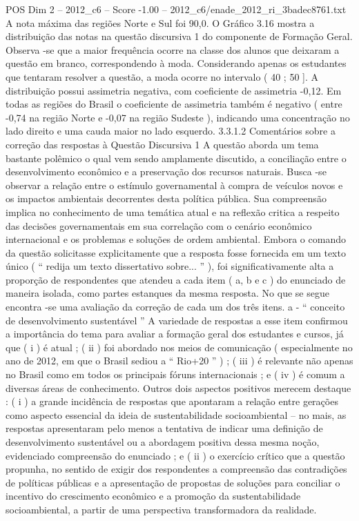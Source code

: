 \begin{textsample}{POS Dim 2 – 2012\_c6 – Score -1.00 – 2012\_c6/enade\_2012\_ri\_3badec8761.txt}
A nota máxima das regiões Norte e Sul foi 90,0.
O Gráfico 3.16 mostra a distribuição das notas na questão discursiva 1 do componente de Formação Geral.
Observa -se que a maior frequência ocorre na classe dos alunos que deixaram a questão em branco, correspondendo à moda.
Considerando apenas os estudantes que tentaram resolver a questão, a moda ocorre no intervalo ( 40 ; 50 ].
A distribuição possui assimetria negativa, com coeficiente de assimetria -0,12.
Em todas as regiões do Brasil o coeficiente de assimetria também é negativo ( entre -0,74 na região Norte e -0,07 na região Sudeste ), indicando uma concentração no lado direito e uma cauda maior no lado esquerdo. 3.3.1.2 Comentários sobre a correção das respostas à Questão Discursiva 1 A questão aborda um tema bastante polêmico o qual vem sendo amplamente discutido, a conciliação entre o desenvolvimento econômico e a preservação dos recursos naturais.
Busca -se observar a relação entre o estímulo governamental à compra de veículos novos e os impactos ambientais decorrentes desta política pública.
Sua compreensão implica no conhecimento de uma temática atual e na reflexão critica a respeito das decisões governamentais em sua correlação com o cenário econômico internacional e os problemas e soluções de ordem ambiental.
Embora o comando da questão solicitasse explicitamente que a resposta fosse fornecida em um texto único ( “ redija um texto dissertativo sobre... ” ), foi significativamente alta a proporção de respondentes que atendeu a cada item ( a, b e c ) do enunciado de maneira isolada, como partes estanques da mesma resposta.
No que se segue encontra -se uma avaliação da correção de cada um dos três itens. a - “ conceito de desenvolvimento sustentável ” A variedade de respostas a esse item confirmou a importância do tema para avaliar a formação geral dos estudantes e cursos, já que ( i ) é atual ; ( ii ) foi abordado nos meios de comunicação ( especialmente no ano de 2012, em que o Brasil sediou a “ Rio+20 ” ) ; ( iii ) é relevante não apenas no Brasil como em todos os principais fóruns internacionais ; e ( iv ) é comum a diversas áreas de conhecimento.
Outros dois aspectos positivos merecem destaque : ( i ) a grande incidência de respostas que apontaram a relação entre gerações como aspecto essencial da ideia de sustentabilidade socioambiental – no mais, as respostas apresentaram pelo menos a tentativa de indicar uma definição de desenvolvimento sustentável ou a abordagem positiva dessa mesma noção, evidenciado compreensão do enunciado ; e ( ii ) o exercício crítico que a questão propunha, no sentido de exigir dos respondentes a compreensão das contradições de políticas públicas e a apresentação de propostas de soluções para conciliar o incentivo do crescimento econômico e a promoção da sustentabilidade socioambiental, a partir de uma perspectiva transformadora da realidade.

\end{textsample}

